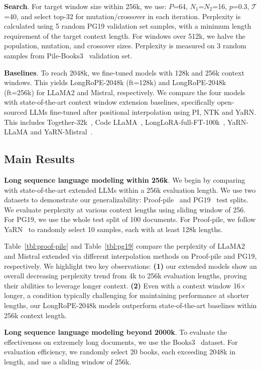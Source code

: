 \textbf{Search}. For target window size within 256k, we use:  $P$=64, $N_1$=$N_2$=16, $p$=0.3, $\mathcal{T}$=40, and select top-32 for mutation/crossover in each iteration. Perplexity is calculated using 5 random PG19 validation set samples, with a minimum length requirement of the target context length. For windows over 512k, we halve the population, mutation, and crossover sizes. Perplexity is measured on 3 random samples from Pile-Books3~\cite{pile} validation set. 

\textbf{Baselines}. To reach 2048k, we fine-tuned models with 128k and 256k context windows. This yields LongRoPE-2048k (ft=128k) and LongRoPE-2048k (ft=256k) for LLaMA2 and Mistral, respectively. We compare the four models with state-of-the-art context window extension baselines, specifically open-sourced LLMs fine-tuned after positional interpolation using PI, NTK and YaRN.  This includes Together-32k~\cite{together}, Code LLaMA~\cite{codellama}, LongLoRA-full-FT-100k~\cite{longlora}, YaRN-LLaMA and YaRN-Mistral~\cite{yarn}. 

\subsection{Main Results}

\label{sec:mainresult}
\textbf{Long sequence language modeling within 256k}. We begin by comparing  with state-of-the-art extended LLMs within a 256k evaluation length. We use two datasets to demonstrate our generalizability: Proof-pile~\cite{pg19} and PG19~\cite{pile} test splits. We evaluate perplexity at various context lengths using  sliding window of 256. For PG19, we use the whole test split of 100 documents. For Proof-pile, we follow YaRN~\cite{yarn} to randomly select 10 samples, each with at  least 128k lengths. 

Table~\ref{tbl:proof-pile} and Table~\ref{tbl:pg19} compare the perplexity of LLaMA2 and Mistral extended via different interpolation methods on Proof-pile and PG19, respectively. We highlight two key observations: \textbf{(1)} our extended models show an overall decreasing perplexity trend   from 4k to 256k evaluation lengths, proving their abilities to leverage longer context. \textbf{(2)} Even with a context window 16$\times$ longer, a condition typically challenging for maintaining performance at shorter lengths, our LongRoPE-2048k models outperform state-of-the-art baselines within 256k context length.

\textbf{Long sequence language modeling beyond 2000k}. To evaluate the effectiveness on extremely long documents, we use the Books3~\cite{pile} dataset. For evaluation efficiency, we randomly select 20 books, each  exceeding 2048k in length, and use a sliding window of 256k. 

